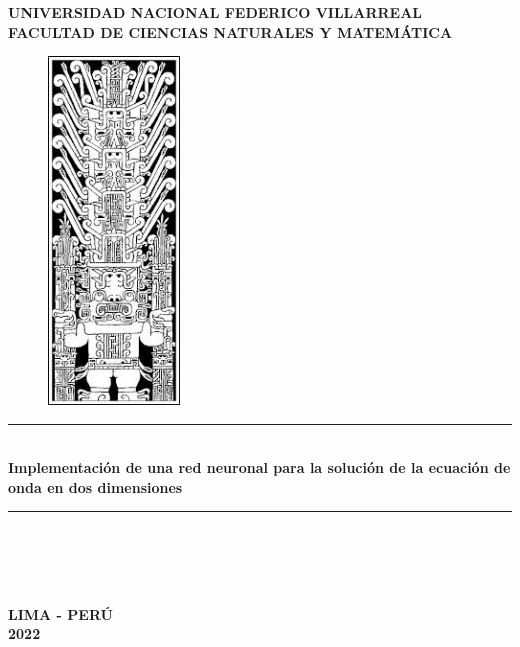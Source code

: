 \begin{titlepage}
\centering
 {\fontsize{16pt}{ \baselineskip}\selectfont \textbf{UNIVERSIDAD NACIONAL FEDERICO VILLARREAL}}\\[0.2cm]
 {\fontsize{14pt}{ \baselineskip}\selectfont \textbf{FACULTAD DE CIENCIAS NATURALES Y MATEMÁTICA}}\\[0.3cm]
\begin{figure}[htb]
\centering
\includegraphics[width=3.5cm]{Cover/UNFV.png}
\end{figure}
\vspace{0.2cm}
\rule{132mm}{0.25mm}\\
{\fontsize{14pt}{ \baselineskip}\selectfont \textbf{Implementación de una red neuronal para la solución de la ecuación de onda en dos dimensiones}}
\rule{132mm}{0.25mm}\\
{\fontsize{12pt}{ \baselineskip}\selectfont {Tesis para optar el Título Profesional de Licenciado en Física}}\\[0.3cm]

{\fontsize{12pt}{ \baselineskip}\selectfont {AUTOR\\ David Brandon Zevallos Garay
}}\\[0.1cm]

{\fontsize{12pt}{ \baselineskip}\selectfont {ASESOR\\
David Brandon Zevallos Garay
}}\\[0.1cm]


\vfill
{\fontsize{12pt}{ \baselineskip}\selectfont \textbf{LIMA - PERÚ}}\\[0.2cm]
{\fontsize{12pt}{ \baselineskip}\selectfont \textbf{2022}}
\end{titlepage}
\restoregeometry
